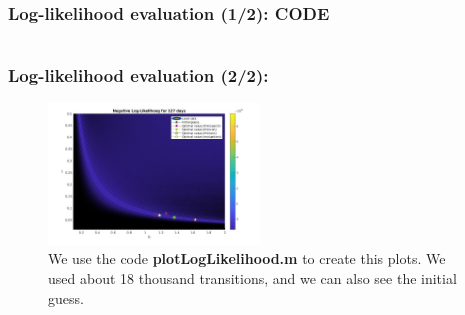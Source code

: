 \documentclass[aspectratio=169]{beamer}\usepackage[utf8]{inputenc}
\begin{document}
\begin{frame}\frametitle{Log-likelihood evaluation (1/2): CODE}

\begin{center}
\begin{tabular}{|c|}
\toprule
{\tiny

}\\
\bottomrule
\end{tabular}
\end{center}

\end{frame}


\begin{frame}\frametitle{Log-likelihood evaluation (2/2):}

\begin{figure}[ht!]
\centering
\includegraphics[width=0.5\textwidth]{../Results/likelihood/normal/Log-Likelihood.jpg}
\caption{We use the code \textbf{plotLogLikelihood.m} to create this plots. We used about 18 thousand transitions, and we can also see the initial guess.}
\end{figure}

\end{frame}
\end{document}

